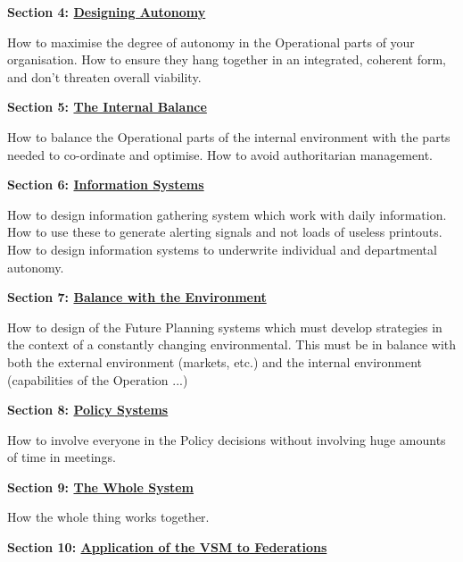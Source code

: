 \textbf{Section 4: \hyperref[DESIGNING AUTONOMY]{Designing Autonomy}}

How to maximise the degree of autonomy in the Operational parts of your organisation. How to ensure they hang together in an integrated, coherent form, and don't threaten overall viability.

\textbf{Section 5: \hyperref[BALANCING THE INTERNAL ENVIRONMENT]{The Internal Balance}}

How to balance the Operational parts of the internal environment with the parts needed to co-ordinate and optimise. How to avoid authoritarian management.

\textbf{Section 6: \hyperref[INFORMATION SYSTEMS]{Information Systems}}

How to design information gathering system which work with daily information. How to use these to generate alerting signals and not loads of useless printouts. How to design information systems to underwrite individual and departmental autonomy.

\textbf{Section 7: \hyperref[BALANCE WITH THE EXTERNAL ENVIRONMENT]{Balance with the Environment}}

How to design of the Future Planning systems which must develop strategies in the context of a constantly changing environmental. This must be in balance with both the external environment (markets, etc.) and the internal environment (capabilities of the Operation ...)

\textbf{Section 8: \hyperref[DESIGNING POLICY SYSTEMS]{Policy Systems}}

How to involve everyone in the Policy decisions without involving huge amounts of time in meetings.

\textbf{Section 9: \hyperref[THE WHOLE SYSTEM]{The Whole System}}

How the whole thing works together.

\textbf{Section 10: \hyperref[APPLICATION TO FEDERATIONS]{Application of the VSM to Federations}}

